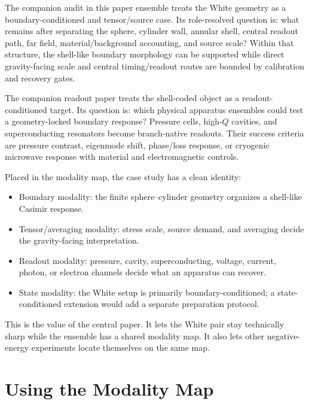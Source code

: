 \documentclass[11pt]{article}
\begin{document}
The companion audit in this paper ensemble treats the White geometry as a
boundary-conditioned and tensor/source case. Its role-resolved question is:
what remains after separating the sphere, cylinder wall, annular shell,
central readout path, far field, material/background accounting, and source
scale? Within that structure, the shell-like boundary morphology can be
supported while direct gravity-facing scale and central timing/readout routes
are bounded by calibration and recovery gates.

The companion readout paper treats the shell-coded object as a
readout-conditioned target. Its question is: which physical apparatus
ensembles could test a geometry-locked boundary response? Pressure cells,
high-\(Q\) cavities, and superconducting resonators become branch-native
readouts. Their success criteria are pressure contrast, eigenmode shift,
phase/loss response, or cryogenic microwave response with material and
electromagnetic controls.

Placed in the modality map, the case study has a clean identity:
\begin{itemize}
\item Boundary modality: the finite sphere--cylinder geometry organizes a
shell-like Casimir response.
\item Tensor/averaging modality: stress scale, source demand, and averaging
decide the gravity-facing interpretation.
\item Readout modality: pressure, cavity, superconducting, voltage, current,
photon, or electron channels decide what an apparatus can recover.
\item State modality: the White setup is primarily boundary-conditioned; a
state-conditioned extension would add a separate preparation protocol.
\end{itemize}

This is the value of the central paper. It lets the White pair stay
technically sharp while the ensemble has a shared modality map. It also
lets other negative-energy experiments locate themselves on the same map.

\section{Using the Modality Map}
\end{document}
